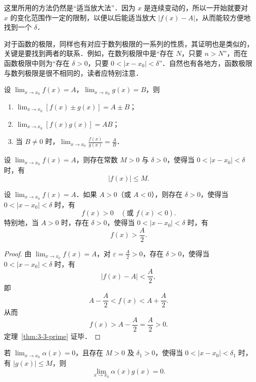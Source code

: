这里所用的方法仍然是``适当放大法''．因为 $x$ 是连续变动的，所以一开始就要对 $x$ 的变化范围作一定的限制，以便以后能适当放大 $|f(x) - A|$，从而能较方便地找到一个 $\delta$．

对于函数的极限，同样也有对应于数列极限的一系列的性质，其证明也是类似的，关键是要找到两者的联系．例如，在数列极限中是``存在 $N$，只要 $n > N$''，而在函数极限中则为``存在 $\delta > 0$，只要 $0 < |x - x_0| < \delta$''．自然也有各地方，函数极限与数列极限是很不相同的，读者应特别注意．

\begin{theorem}[四则运算]\label{thm:3-1-prime}
设 $\lim_{x \to x_0} f(x) = A$，$\lim_{x \to x_0} g(x) = B$，则
\begin{enumerate}[label=(\roman*)]
\item $\lim_{x \to x_0} [f(x) \pm g(x)] = A \pm B$；
\item $\lim_{x \to x_0} [f(x)g(x)] = AB$；
\item 当 $B \neq 0$ 时，$\lim_{x \to x_0} \frac{f(x)}{g(x)} = \frac{A}{B}$．
\end{enumerate}
\end{theorem}

\begin{theorem}[局部有界性]\label{thm:3-2-prime}
设 $\lim_{x \to x_0} f(x) = A$，则存在常数 $M > 0$ 与 $\delta > 0$，使得当 $0 < |x - x_0| < \delta$ 时，有
\[
|f(x)| \leqslant M.
\]
\end{theorem}

\begin{theorem}[局部保号性]\label{thm:3-3-prime}
设 $\lim_{x \to x_0} f(x) = A$．如果 $A > 0$（或 $A < 0$），则存在 $\delta > 0$，使得当 $0 < |x - x_0| < \delta$ 时，有
\[
f(x) > 0 \quad (\text{或 } f(x) < 0).
\]
特别地，当 $A > 0$ 时，存在 $\delta > 0$，使得当 $0 < |x - x_0| < \delta$ 时，有
\[
f(x) > \frac{A}{2}.
\]
\end{theorem}

\begin{proof}
由 $\lim_{x \to x_0} f(x) = A$，对 $\varepsilon = \frac{A}{2} > 0$，存在 $\delta > 0$，使得当 $0 < |x - x_0| < \delta$ 时，有
\[
|f(x) - A| < \frac{A}{2},
\]
即
\[
A - \frac{A}{2} < f(x) < A + \frac{A}{2}.
\]
从而
\[
f(x) > A - \frac{A}{2} = \frac{A}{2} > 0.
\]
定理~\ref{thm:3-3-prime} 证毕．
\end{proof}

\begin{theorem}[无穷小与局部有界函数之积]\label{thm:3-4-prime}
若 $\lim_{x \to x_0} \alpha(x) = 0$，且存在 $M > 0$ 及 $\delta_1 > 0$，使得当 $0 < |x - x_0| < \delta_1$ 时，有 $|g(x)| \leqslant M$，则
\[
\lim_{x \to x_0} \alpha(x)g(x) = 0.
\]
\end{theorem}

